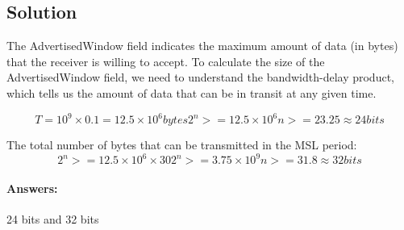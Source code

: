 \documentclass[11pt]{article}
\begin{document}
    \subsection{Solution}
    The AdvertisedWindow field indicates the maximum amount of data (in bytes) that the receiver is willing to accept.
    To calculate the size of the AdvertisedWindow field, we need to understand the bandwidth-delay product,
    which tells us the amount of data that can be in transit at any given time.


    \begin{subequations}
        \begin{equation}
            T = 10^9 \times 0.1 = 12.5 \times 10^6 bytes
        \end{equation}

        \begin{equation}
            2^n >= 12.5 \times 10^6
        \end{equation}

        \begin{equation}
            n >= 23.25 \approx 24 bits
        \end{equation}
    \end{subequations}

    The total number of bytes that can be transmitted in the MSL period:
    \begin{subequations}
        \begin{equation}
            2^n >= 12.5 \times 10^6 \times 30
        \end{equation}

        \begin{equation}
            2^n >= 3.75 \times 10^9
        \end{equation}

        \begin{equation}
            n >= 31.8 \approx 32 bits
        \end{equation}
    \end{subequations}

    \paragraph{Answers:} 24 bits and 32 bits
    \newpage
\end{document}

